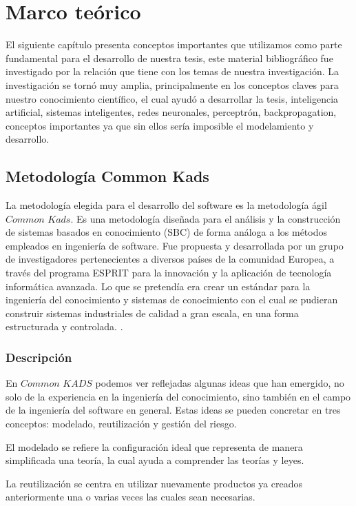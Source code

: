 \section{Marco teórico}
El siguiente capítulo presenta conceptos importantes que utilizamos como parte fundamental para el desarrollo de nuestra tesis, este material bibliográfico fue investigado por la relación que tiene con los temas de nuestra investigación. La investigación se tornó muy amplia, principalmente en los conceptos claves para nuestro conocimiento científico, el cual ayudó a desarrollar la tesis, inteligencia artificial, sistemas inteligentes, redes neuronales, perceptrón, backpropagation, conceptos importantes ya que sin ellos sería imposible el modelamiento y desarrollo.

\subsection{Metodología Common Kads}

La metodología elegida para el desarrollo del software es la metodología ágil $Common$ $Kads$. Es una metodología diseñada para el análisis y la construcción de sistemas basados en  conocimiento (SBC) de forma análoga a los métodos empleados en ingeniería de software. Fue propuesta y desarrollada por un grupo de investigadores pertenecientes a diversos países de la comunidad Europea, a través del programa ESPRIT para la innovación y la aplicación de tecnología informática avanzada. Lo que se pretendía era crear un estándar para la ingeniería del conocimiento y
sistemas de conocimiento con el cual se pudieran construir sistemas industriales de calidad a gran escala, en una forma estructurada y controlada. \citep{lagos2002commonkads}.


\subsubsection{Descripción}
En $Common$ $KADS$ podemos ver reflejadas algunas ideas que han emergido, no solo de la experiencia en la ingeniería del conocimiento, sino también en el campo de la ingeniería del software en general. Estas ideas se pueden concretar en tres conceptos: modelado, reutilización y gestión del riesgo.

El modelado se refiere la configuración ideal que representa de manera simplificada una teoría, la cual ayuda a comprender las teorías y leyes.

La reutilización se centra en utilizar nuevamente productos ya creados anteriormente una o varias veces las cuales sean necesarias.

